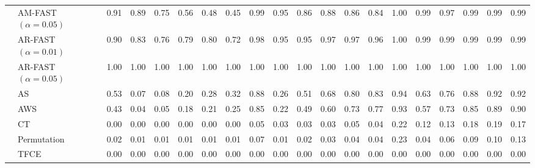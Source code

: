 \begin{table}[h]
{\begin{tabular}{|c|l|cccccc|cccccc|cccccc|}
      &  AM-FAST $(\alpha=0.05)$& 0.91 & 0.89 & 0.75 & 0.56 & 0.48 & 0.45 & 0.99 & 0.95 & 0.86 & 0.88 & 0.86 & 0.84 & 1.00 & 0.99 & 0.97 & 0.99 & 0.99 & 0.99 \\ 
        & AR-FAST $(\alpha=0.01)$ & 0.90 & 0.83 & 0.76 & 0.79 & 0.80 & 0.72 & 0.98 & 0.95 & 0.95 & 0.97 & 0.97 & 0.96 & 1.00 & 0.99 & 0.99 & 0.99 & 0.99 & 0.99 \\
        & AR-FAST $(\alpha=0.05)$ & 1.00 & 1.00 & 1.00 & 1.00 & 1.00 & 1.00 & 1.00 & 1.00 & 1.00 & 1.00 & 1.00 & 1.00 & 1.00 & 1.00 & 1.00 & 1.00 & 1.00 & 1.00 \\ 
 & AS & 0.53 & 0.07 & 0.08 & 0.20 & 0.28 & 0.32 & 0.88 & 0.26 & 0.51 & 0.68 & 0.80 & 0.83 & 0.94 & 0.63 & 0.76 & 0.88 & 0.92 & 0.92 \\ 
  & AWS & 0.43 & 0.04 & 0.05 & 0.18 & 0.21 & 0.25 & 0.85 & 0.22 & 0.49 & 0.60 & 0.73 & 0.77 & 0.93 & 0.57 & 0.73 & 0.85 & 0.89 & 0.90 \\ 
 & CT & 0.00 & 0.00 & 0.00 & 0.00 & 0.00 & 0.00 & 0.05 & 0.03 & 0.03 & 0.03 & 0.05 & 0.04 & 0.22 & 0.12 & 0.13 & 0.18 & 0.19 & 0.17 \\ 
 & Permutation & 0.02 & 0.01 & 0.01 & 0.01 & 0.01 & 0.01 & 0.07 & 0.01 & 0.02 & 0.03 & 0.04 & 0.04 & 0.23 & 0.04 & 0.06 & 0.09 & 0.10 & 0.13 \\ 
&  TFCE & 0.00 & 0.00 & 0.00 & 0.00 & 0.00 & 0.00 & 0.00 & 0.00 & 0.00 & 0.00 & 0.00 & 0.00 & 0.00 & 0.00 & 0.00 & 0.00 & 0.00 & 0.00 \\ 
   \hline
      \end{tabular}
    }
  \end{table}


